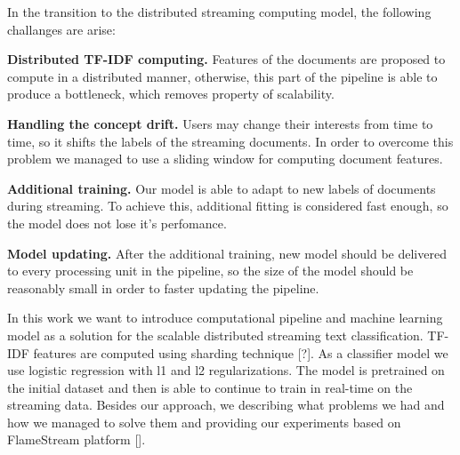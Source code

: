 In the transition to the distributed streaming computing model, the following challanges are arise:

\textbf{Distributed TF-IDF computing.} Features of the documents are proposed to compute in a distributed manner, otherwise, this part of the pipeline is able to produce a bottleneck, which removes property of scalability.

\textbf{Handling the concept drift.} Users may change their interests from time to time, so it shifts the labels of the streaming documents. In order to overcome this problem we managed to use a sliding window for computing document features.

\textbf{Additional training.} Our model is able to adapt to new labels of documents during streaming. To achieve this, additional fitting is considered fast enough, so the model does not lose it's perfomance.

\textbf{Model updating.} After the additional training, new model should be delivered to every processing unit in the pipeline, so the size of the model should be reasonably small in order to faster updating the pipeline.

In this work we want to introduce computational pipeline and machine learning model as a solution for the scalable distributed streaming text classification. TF-IDF features are computed using sharding technique [?]. As a classifier model we use logistic regression with l1 and l2 regularizations. The model is pretrained on the initial dataset and then is able to continue to train in real-time on the streaming data. Besides our approach, we describing what problems we had and how we managed to solve them and providing our experiments based on FlameStream platform [].

